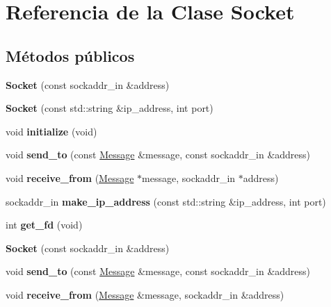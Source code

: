 \hypertarget{classSocket}{}\section{Referencia de la Clase Socket}
\label{classSocket}
\subsection*{Métodos públicos}
\begin{DoxyCompactItemize}
\item 
\mbox{\label{classSocket_af39d585afaf3db6afb9d8c074aceaffc}} 
{\bfseries Socket} (const sockaddr\+\_\+in \&address)
\item 
\mbox{\label{classSocket_a1a462d8fa17ec0bef3b542ff7c452bdd}} 
{\bfseries Socket} (const std\+::string \&ip\+\_\+address, int port)
\item 
\mbox{\label{classSocket_a8bbd9b070c3e50e2094ac2e0ab9e4f25}} 
void {\bfseries initialize} (void)
\item 
\mbox{\label{classSocket_a265f6d171617b94de0d7f57fb4c02172}} 
void {\bfseries send\+\_\+to} (const \hyperlink{structMessage}{Message} \&message, const sockaddr\+\_\+in \&address)
\item 
\mbox{\label{classSocket_a51ce318b08835c52c9ea787d37f048bc}} 
void {\bfseries receive\+\_\+from} (\hyperlink{structMessage}{Message} $\ast$message, sockaddr\+\_\+in $\ast$address)
\item 
\mbox{\label{classSocket_a2e4b86f8d120f4ca63746b16dd47dfbd}} 
sockaddr\+\_\+in {\bfseries make\+\_\+ip\+\_\+address} (const std\+::string \&ip\+\_\+address, int port)
\item 
\mbox{\label{classSocket_a2b5306c6ffeca9c73bbc118993c0a682}} 
int {\bfseries get\+\_\+fd} (void)
\item 
\mbox{\label{classSocket_af39d585afaf3db6afb9d8c074aceaffc}} 
{\bfseries Socket} (const sockaddr\+\_\+in \&address)
\item 
\mbox{\label{classSocket_a265f6d171617b94de0d7f57fb4c02172}} 
void {\bfseries send\+\_\+to} (const \hyperlink{structMessage}{Message} \&message, const sockaddr\+\_\+in \&address)
\item 
\mbox{\label{classSocket_aafce5d35e9f5098d282c7478bacc3bfc}} 
void {\bfseries receive\+\_\+from} (\hyperlink{structMessage}{Message} \&message, sockaddr\+\_\+in \&address)
\end{DoxyCompactItemize}

